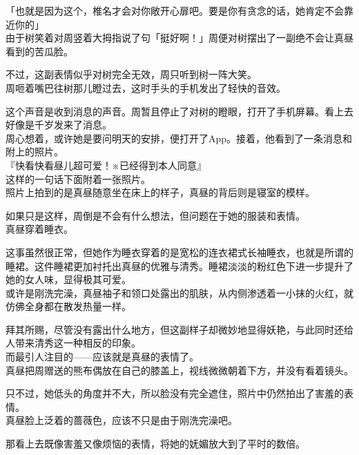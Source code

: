 「也就是因为这个，椎名才会对你敞开心扉吧。要是你有贪念的话，她肯定不会靠近你的」\\

由于树笑着对周竖着大拇指说了句「挺好啊！」周便对树摆出了一副绝不会让真昼看到的苦瓜脸。

不过，这副表情似乎对树完全无效，周只听到树一阵大笑。\\

周咂着嘴巴往树那儿瞪过去，这时手头的手机发出了轻快的音效。

这个声音是收到消息的声音。周暂且停止了对树的瞪眼，打开了手机屏幕。看上去好像是千岁发来了消息。\\

周心想着，或许她是要问明天的安排，便打开了App。接着，他看到了一条消息和附上的照片。\\

『快看快看昼儿超可爱！※已经得到本人同意』\\

这样的一句话下面附着一张照片。\\

照片上拍到的是真昼随意坐在床上的样子，真昼的背后则是寝室的模样。

如果只是这样，周倒是不会有什么想法，但问题在于她的服装和表情。\\

真昼穿着睡衣。

这事虽然很正常，但她作为睡衣穿着的是宽松的连衣裙式长袖睡衣，也就是所谓的睡裙。这件睡裙更加衬托出真昼的优雅与清秀。睡裙淡淡的粉红色下进一步提升了她的女人味，显得极其可爱。\\

或许是刚洗完澡，真昼袖子和领口处露出的肌肤，从内侧渗透着一小抹的火红，就仿佛全身都在散发热量一样。

拜其所赐，尽管没有露出什么地方，但这副样子却微妙地显得妖艳，与此同时还给人带来清秀这一种相反的印象。\\

而最引人注目的——应该就是真昼的表情了。\\

真昼把周赠送的熊布偶放在自己的膝盖上，视线微微朝着下方，并没有看着镜头。

只不过，她低头的角度并不大，所以脸没有完全遮住，照片中仍然拍出了害羞的表情。\\

真昼脸上泛着的蔷薇色，应该不只是由于刚洗完澡吧。

那看上去既像害羞又像烦恼的表情，将她的妩媚放大到了平时的数倍。\\

